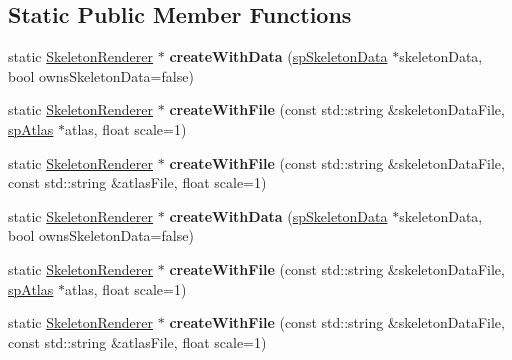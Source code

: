 \subsection*{Static Public Member Functions}
\begin{DoxyCompactItemize}
\item 
\mbox{\label{classspine_1_1SkeletonRenderer_af5ccc2936a407fe11b5686a6fcc3e3e0}} 
static \hyperlink{classspine_1_1SkeletonRenderer}{Skeleton\+Renderer} $\ast$ {\bfseries create\+With\+Data} (\hyperlink{structspSkeletonData}{sp\+Skeleton\+Data} $\ast$skeleton\+Data, bool owns\+Skeleton\+Data=false)
\item 
\mbox{\label{classspine_1_1SkeletonRenderer_a1734cf15fb105e286d73b45cf9136313}} 
static \hyperlink{classspine_1_1SkeletonRenderer}{Skeleton\+Renderer} $\ast$ {\bfseries create\+With\+File} (const std\+::string \&skeleton\+Data\+File, \hyperlink{structspAtlas}{sp\+Atlas} $\ast$atlas, float scale=1)
\item 
\mbox{\label{classspine_1_1SkeletonRenderer_a4d9e691a05f122430ae550e330f1a11d}} 
static \hyperlink{classspine_1_1SkeletonRenderer}{Skeleton\+Renderer} $\ast$ {\bfseries create\+With\+File} (const std\+::string \&skeleton\+Data\+File, const std\+::string \&atlas\+File, float scale=1)
\item 
\mbox{\label{classspine_1_1SkeletonRenderer_a2ebb77c69d1cca64336df2b18470ca7e}} 
static \hyperlink{classspine_1_1SkeletonRenderer}{Skeleton\+Renderer} $\ast$ {\bfseries create\+With\+Data} (\hyperlink{structspSkeletonData}{sp\+Skeleton\+Data} $\ast$skeleton\+Data, bool owns\+Skeleton\+Data=false)
\item 
\mbox{\label{classspine_1_1SkeletonRenderer_ad9a0192e63061551c618a790c1e8493f}} 
static \hyperlink{classspine_1_1SkeletonRenderer}{Skeleton\+Renderer} $\ast$ {\bfseries create\+With\+File} (const std\+::string \&skeleton\+Data\+File, \hyperlink{structspAtlas}{sp\+Atlas} $\ast$atlas, float scale=1)
\item 
\mbox{\label{classspine_1_1SkeletonRenderer_a3778fb1a8bd84a21144d9725be0b4330}} 
static \hyperlink{classspine_1_1SkeletonRenderer}{Skeleton\+Renderer} $\ast$ {\bfseries create\+With\+File} (const std\+::string \&skeleton\+Data\+File, const std\+::string \&atlas\+File, float scale=1)
\end{DoxyCompactItemize}
